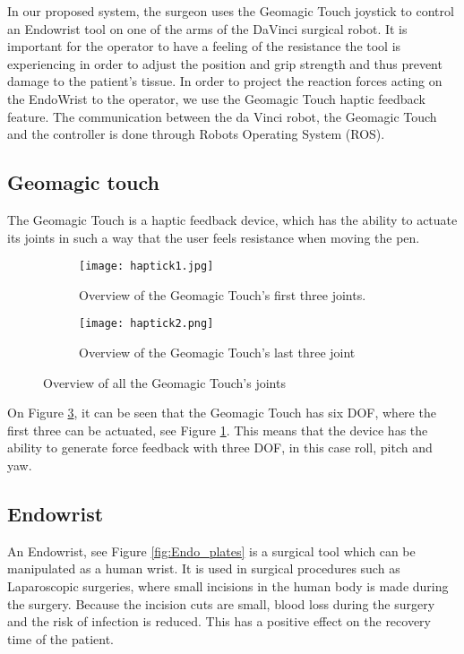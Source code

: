 In our proposed system, the surgeon uses the Geomagic Touch joystick to control an Endowrist tool on one of the arms of the DaVinci surgical robot.
It is important for the operator to have a feeling of the resistance the tool is experiencing in order to adjust the position and grip strength and thus prevent damage to the patient's tissue.
In order to project the reaction forces acting on the EndoWrist to the operator, we use the Geomagic Touch haptic feedback feature. The communication between the da Vinci robot, the Geomagic Touch and the controller is done through Robots Operating System (ROS).



\subsection{Geomagic touch}\label{sec:Geomagic_touch}
The Geomagic Touch is a haptic feedback device, which has the ability to actuate its joints in such a way that the user feels resistance when moving the pen. 


\begin{figure}
  \centering
  \begin{subfigure}{.22\textwidth}
    \centering
    \texttt{[image: haptick1.jpg]}
    \caption{Overview of the Geomagic Touch's first three joints.}
    \label{fig:phantom1}
  \end{subfigure}
  \begin{subfigure}{.22\textwidth}
    \centering
    \texttt{[image: haptick2.png]}
    \caption{Overview of the Geomagic Touch's last three joint}
    \label{fig:phantom2}
  \end{subfigure}
\caption{Overview of all the Geomagic Touch's joints\cite{phantom_omni}}
\label{fig:phantom_omni}
\end{figure}


On Figure \ref{fig:phantom_omni}, it can be seen that the Geomagic Touch has six DOF, where the first three can be actuated, see Figure \ref{fig:phantom1}. This means that the device has the ability to generate force feedback with three DOF, in this case roll, pitch and yaw.



    
\subsection{Endowrist}
An Endowrist, see Figure \ref{fig:Endo_plates} is a surgical tool which can be manipulated as a human wrist.
It is used in surgical procedures such as Laparoscopic surgeries,  where small incisions in the human body is made during the surgery.
Because the incision cuts are small, blood loss during the surgery and the risk of infection is reduced. This has a positive effect on the recovery time of the patient\cite{RIGSP}.


